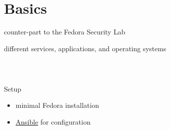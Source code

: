 \section{Basics}
%
\begin{frame}
counter-part to the Fedora Security Lab
\end{frame}
%
\begin{frame}
different services, applications, and operating systems
\end{frame}
%
\begin{frame}
\frametitle{\\}
%
{\LARGE Setup \newline}
\begin{itemize}
  \item minimal Fedora installation
  \item \href{http://www.ansibleworks.com/}{Ansible} for configuration
\end{itemize}
\end{frame}
%
